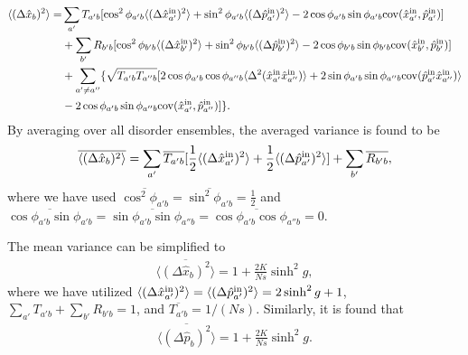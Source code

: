 \documentclass[9pt,twocolumn,twoside]{osajnl}
\begin{document}
\begin{align}
\langle (\Delta \hat{x}_{b})^2 \rangle =& 
\sum_{a'}{T_{a'b}[\cos^2 \phi_{a'b}\langle (\Delta \hat{x}_{a'}^{\rm{in}})^2 \rangle + \sin^2 \phi_{a'b}\langle (\Delta \hat{p}_{a'}^{\rm{in}})^2 \rangle - 2\cos \phi_{a'b} \sin \phi_{a'b} {\rm{cov}}(\hat{x}_{a'}^{\rm{in}}, \hat{p}_{a'}^{\rm{in}})]} \\ \nonumber
& + \sum_{b'}{R_{b'b}[\cos^2 \phi_{b'b}\langle (\Delta \hat{x}_{b'}^{\rm{in}})^2 \rangle + \sin^2 \phi_{b'b}\langle (\Delta \hat{p}_{b'}^{\rm{in}})^2 \rangle - 2\cos \phi_{b'b} \sin \phi_{b'b} {\rm{cov}}(\hat{x}_{b'}^{\rm{in}}, \hat{p}_{b'}^{\rm{in}}) ]}\\ \nonumber
& + \sum_{a'\neq a''} \{ \sqrt{T_{a'b} T_{a''b}} [2\cos \phi_{a' b} \cos \phi_{a''b}  \langle \Delta^2(\hat{x}_{a'}^{\rm{in}} \hat{x}_{a''}^{\rm{in}}) \rangle + 2\sin \phi_{a' b} \sin \phi_{a''b}  {\rm{cov}}(\hat{p}_{a'}^{\rm{in}} \hat{x}_{a''}^{\rm{in}}) \rangle \\ \nonumber
&-2\cos \phi_{a'b} \sin \phi_{a''b} {\rm{cov}}(\hat{x}_{a'}^{\rm{in}}, \hat{p}_{a''}^{\rm{in}}) ] \}.
\end{align}
By averaging over all disorder ensembles, the averaged variance is found to be
\begin{align}
\overline{\langle (\Delta \hat{x}_{b})^2 \rangle} = \sum_{a'} \overline{T_{a'b}} [\frac{1}{2} \langle (\Delta \hat{x}_{a'}^{\rm{in}})^2 \rangle + \frac{1}{2} \langle (\Delta \hat{p}_{a'}^{\rm{in}})^2 \rangle] + \sum_{b'} \overline{R_{b'b}},
\end{align}
where we have used $\overline{\cos^2 \phi_{a'b}} = \overline{\sin^2 \phi_{a'b}} = \frac{1}{2}$ and $\overline{\cos \phi_{a'b}\sin \phi_{a'b}} = \overline{\sin \phi_{a'b}\sin \phi_{a''b}} = \overline{\cos \phi_{a'b}\cos \phi_{a''b}} =0$.

The mean variance can be simplified to
\begin{align}
\label{varx3}
\overline{\langle (\Delta \hat{x}_{b})^2 \rangle} = 1+ \frac{2 K}{Ns}  \sinh^2 g,
\end{align}
where we have utilized $\langle (\Delta \hat{x}_{a'}^{\rm{in}})^2 \rangle = \langle (\Delta \hat{p}_{a'}^{\rm{in}})^2 \rangle = 2 \sinh^2 g + 1$, $\sum_{a'} T_{a'b} + \sum_{b'} R_{b'b} = 1$, and $\overline{T_{a'b}} = 1/(Ns)$. Similarly, it is found that
\begin{align}
\label{varp3}
\overline{\langle (\Delta \hat{p}_{b})^2 \rangle} = 1+ \frac{2 K}{Ns} \sinh^2 g.
\end{align}
\end{document}
